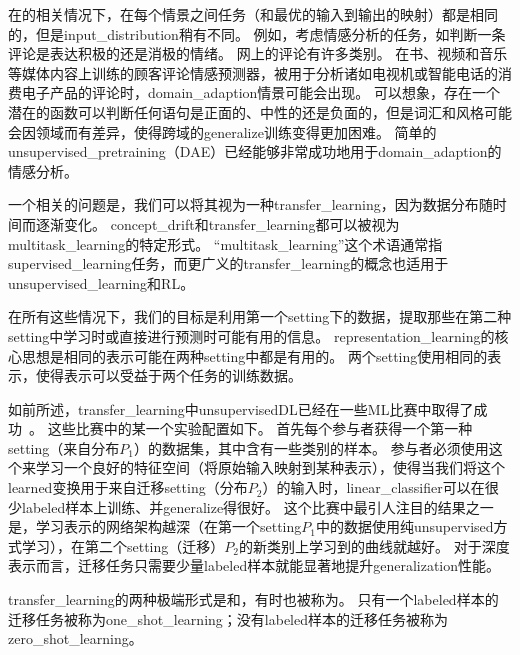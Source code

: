 在的相关情况下，在每个情景之间任务（和最优的输入到输出的映射）都是相同的，但是\gls{input_distribution}稍有不同。 
例如，考虑情感分析的任务，如判断一条评论是表达积极的还是消极的情绪。 
网上的评论有许多类别。
在书、视频和音乐等媒体内容上训练的顾客评论情感预测器，被用于分析诸如电视机或智能电话的消费电子产品的评论时，\gls{domain_adaption}情景可能会出现。%
可以想象，存在一个潜在的函数可以判断任何语句是正面的、中性的还是负面的，但是词汇和风格可能会因领域而有差异，使得跨域的\gls{generalize}训练变得更加困难。
简单的\gls{unsupervised_pretraining}（\gls{DAE}）已经能够非常成功地用于\gls{domain_adaption}的情感分析\citep{Glorot+al-ICML-2011}。


一个相关的问题是，我们可以将其视为一种\gls{transfer_learning}，因为数据分布随时间而逐渐变化。
\gls{concept_drift}和\gls{transfer_learning}都可以被视为\gls{multitask_learning}的特定形式。
``\gls{multitask_learning}''这个术语通常指\gls{supervised_learning}任务，而更广义的\gls{transfer_learning}的概念也适用于\gls{unsupervised_learning}和\gls{RL}。


在所有这些情况下，我们的目标是利用第一个\gls{setting}下的数据，提取那些在第二种\gls{setting}中学习时或直接进行预测时可能有用的信息。
\gls{representation_learning}的核心思想是相同的表示可能在两种\gls{setting}中都是有用的。
两个\gls{setting}使用相同的表示，使得表示可以受益于两个任务的训练数据。


如前所述，\gls{transfer_learning}中\gls{unsupervised}\gls{DL}已经在一些\gls{ML}比赛中取得了成功~\citep{UTLC+LISA-2011-small,goodfellow+all-NIPS2011}。
这些比赛中的某一个实验配置如下。
首先每个参与者获得一个第一种\gls{setting}（来自分布$P_1$）的数据集，其中含有一些类别的样本。
参与者必须使用这个来学习一个良好的特征空间（将原始输入映射到某种表示），使得当我们将这个\gls{learned}变换用于来自迁移\gls{setting}（分布$P_2$）的输入时，\gls{linear_classifier}可以在很少\gls{labeled}样本上训练、并\gls{generalize}得很好。
这个比赛中最引人注目的结果之一是，学习表示的网络架构越深（在第一个\gls{setting}$P_1$中的数据使用纯\gls{unsupervised}方式学习），在第二个\gls{setting}（迁移）$P_2$的新类别上学习到的曲线就越好。
对于深度表示而言，迁移任务只需要少量\gls{labeled}样本就能显著地提升\gls{generalization}性能。


\gls{transfer_learning}的两种极端形式是和，有时也被称为。
只有一个\gls{labeled}样本的迁移任务被称为\gls{one_shot_learning}；没有\gls{labeled}样本的迁移任务被称为\gls{zero_shot_learning}。

